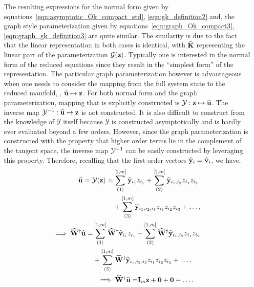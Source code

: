  The resulting expressions for the normal form given by equations~\eqref{eqn:asymptotic_Ok_compact_std},  \eqref{eqn:gk_definition2} and, the graph style parameterization given by equations~\eqref{eqn:graph_Ok_compact3}, \eqref{eqn:graph_gk_definition3} are quite similar. The similarity is due to the fact that the linear representation in both cases is identical, with $\mathbf{\widehat{K}}$ representing the linear part of the parameterization $\mathcal{G}(\mathbf{z})$. Typically one is interested in the normal form of the reduced equations since they result in the ``simplest form'' of the representation. The particular graph parameterization however is advantageous when one needs to consider the mapping from the full system state to the reduced manifold, \ie, $\widehat{\mathbf{u}} \mapsto \mathbf{z}$. For both normal form and the graph parameterization, mapping that is explicitly constructed is $\mathcal{Y}: \mathbf{z} \mapsto \widehat{\mathbf{u}}$. The inverse map $\mathrm{\mathcal{Y}^{-1}}: \widehat{\mathbf{u}} \mapsto \mathbf{z}$ is not constructed. It is also difficult to construct from the knowledge of $\mathcal{Y}$ itself  because $\mathcal{Y}$ is constructed asymptotically and is hardly ever evaluated beyond a few orders. However, since the graph parameterization is constructed with the property that higher order terms lie in the complement of the tangent space, the inverse map $\mathrm{\mathcal{Y}^{-1}}$ can be easily constructed by leveraging this property. Therefore, recalling that the first order vectors $\widehat{\mathbf{y}}_{i} = \widehat{\mathbf{v}}_{i}$, we have,
 \begin{align}
 		\begin{split}
 		\widehat{\mathbf{u}} = \mathcal{Y}(\mathbf{z}) =& \sum^{[1,m]}_{(1)}\widehat{\mathbf{y}}_{i_{1}}z_{i_{1}} + \sum^{[1,m]}_{(2)}\widehat{\mathbf{y}}_{i_{1},i_{2}}z_{i_{1}}z_{i_{2}} \\
 		& + \sum^{[1,m]}_{(3)}\widehat{\mathbf{y}}_{i_{1},i_{2},i_{3}}z_{i_{1}}z_{i_{2}}z_{i_{3}} + \ldots,
 	\end{split} \nonumber \\
 	\begin{split}
 		\implies\widehat{\mathbf{W}}^{\dagger}\widehat{\mathbf{u}} =& \sum^{[1,m]}_{(1)}\widehat{\mathbf{W}}^{\dagger}\widehat{\mathbf{v}}_{i_{1}}z_{i_{1}} + \sum^{[1,m]}_{(2)}\widehat{\mathbf{W}}^{\dagger}\widehat{\mathbf{y}}_{i_{1},i_{2}}z_{i_{1}}z_{i_{2}} \\
 		& + \sum^{[1,m]}_{(3)}\widehat{\mathbf{W}}^{\dagger}\widehat{\mathbf{y}}_{i_{1},i_{2},i_{3}}z_{i_{1}}z_{i_{2}}z_{i_{3}} + \ldots,
 	\end{split} \nonumber \\
 	\begin{split}
 		\implies\widehat{\mathbf{W}}^{\dagger}\widehat{\mathbf{u}} =& \mathbf{I}_{m}\mathbf{z} + \mathbf{0} + \mathbf{0} + \ldots .
 	\end{split} \nonumber
 \end{align}
